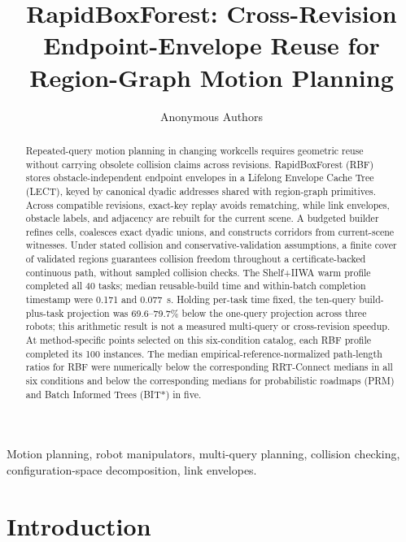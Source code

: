 \documentclass[journal]{IEEEtran}
\newcommand{\rbf}{RBF}
\begin{document}
\title{RapidBoxForest: Cross-Revision Endpoint-Envelope Reuse for Region-Graph Motion Planning}

\author{Anonymous Authors}

\maketitle

\begin{abstract}
Repeated-query motion planning in changing workcells requires geometric reuse
without carrying obsolete collision claims across revisions.
RapidBoxForest (\rbf{}) stores obstacle-independent endpoint envelopes in a
Lifelong Envelope Cache Tree (LECT), keyed by canonical dyadic addresses
shared with region-graph primitives. Across compatible revisions,
exact-key replay avoids rematching, while link envelopes, obstacle labels, and
adjacency are rebuilt for the current scene. A budgeted builder refines
cells, coalesces exact dyadic unions, and constructs corridors from current-scene
witnesses. Under stated collision and conservative-validation assumptions,
a finite cover of validated regions guarantees collision freedom
throughout a certificate-backed continuous path, without sampled collision checks.
The Shelf+IIWA warm profile completed all 40 tasks; median reusable-build time
and within-batch completion timestamp were 0.171 and 0.077~s.
Holding per-task time fixed,
the ten-query build-plus-task projection was 69.6--79.7\% below the one-query
projection across three robots; this arithmetic result is not a measured
multi-query or cross-revision speedup. At method-specific points selected on
this six-condition catalog, each \rbf{} profile completed its 100 instances.
The median empirical-reference-normalized
path-length ratios for \rbf{} were numerically below the corresponding
RRT-Connect medians in all six conditions and below the corresponding medians
for probabilistic roadmaps (PRM) and Batch Informed Trees (BIT*) in five.
\end{abstract}

\begin{IEEEkeywords}
Motion planning, robot manipulators, multi-query planning, collision checking,
configuration-space decomposition, link envelopes.
\end{IEEEkeywords}

\section{Introduction}\label{sec:intro}
\end{document}
